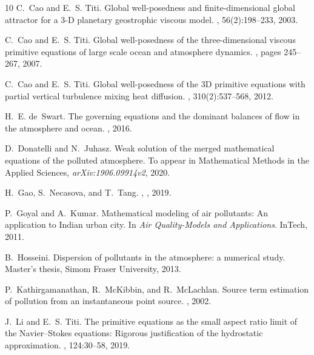 \documentclass[11pt, a4paper]{article}
\begin{document}
\begin{thebibliography}{10}
C.~Cao and E.~S. Titi.
\newblock Global well-posedness and finite-dimensional global attractor for a 3-D planetary geostrophic viscous model.
, 56(2):198--233, 2003.

C.~Cao and E.~S. Titi.
\newblock Global well-posedness of the three-dimensional viscous primitive equations of large scale ocean and atmosphere dynamics.
, pages 245--267, 2007.

C.~Cao and E.~S. Titi.
\newblock Global well-posedness of the 3D primitive equations with partial vertical turbulence mixing heat diffusion.
, 310(2):537--568, 2012.

H.~E. de~Swart.
\newblock The governing equations and the dominant balances of flow in the atmosphere and ocean.
, 2016.

D.~Donatelli and N.~Juhasz.
\newblock Weak solution of the merged mathematical equations of the polluted atmosphere.
\newblock To appear in Mathematical Methods in the Applied Sciences, {\em arXiv:1906.09914v2}, 2020.


H.~Gao, S.~Necasova, and T.~Tang.
, 
, 2019.

P.~Goyal and A.~Kumar.
\newblock Mathematical modeling of air pollutants: An application to Indian urban city.
\newblock In {\em Air Quality-Models and Applications}. InTech, 2011.

B.~Hosseini.
\newblock Dispersion of pollutants in the atmosphere: a numerical study.
\newblock Master's thesis, Simom Fraser University, 2013.

P.~Kathirgamanathan, R.~McKibbin, and R.~McLachlan.
\newblock Source term estimation of pollution from an instantaneous point source.
, 2002.

J.~Li and E.~S. Titi.
\newblock The primitive equations as the small aspect ratio limit of the Navier--Stokes equations: Rigorous justification of the hydrostatic approximation.
, 124:30--58, 2019.


\end{thebibliography}
\end{document}
